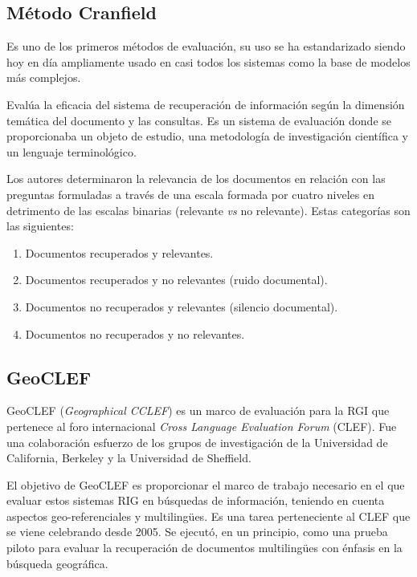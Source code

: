 \subsection{Método Cranfield}\label{sec:Cranfield}

Es uno de los primeros métodos de evaluación, su uso se ha estandarizado 
siendo hoy en día ampliamente usado en casi todos los sistemas como la base de
modelos más complejos.\cite{hosseini2013}

Evalúa la eficacia del sistema de recuperación de información según la
dimensión temática del documento y las consultas. Es un sistema de evaluación
donde se proporcionaba un objeto de estudio, una metodología de investigación
científica y un lenguaje terminológico.

Los autores determinaron la relevancia de los documentos en relación
con las preguntas formuladas a través de una escala formada por cuatro niveles
en detrimento de las escalas binarias (relevante \emph{vs} no relevante).
Estas categorías son las siguientes: 

\begin{enumerate}
    \item Documentos recuperados y relevantes.
    \item Documentos recuperados y no relevantes (ruido documental).
    \item Documentos no recuperados y relevantes (silencio documental).
    \item Documentos no recuperados y no relevantes. 
\end{enumerate}

\subsection{GeoCLEF}\label{sec:GeoCLEF}

GeoCLEF (\emph{Geographical CCLEF}) es un marco de evaluación para la RGI que
pertenece al foro internacional \emph{Cross Language Evaluation Forum} (CLEF).
Fue una colaboración esfuerzo de los grupos de investigación de la Universidad
de California, Berkeley y la Universidad de Sheffield.
\cite{gey2005, kornai2005}

El objetivo de GeoCLEF es proporcionar el marco de trabajo necesario en el que
evaluar estos sistemas RIG en búsquedas de información, teniendo en cuenta
aspectos geo-referenciales y multiling\"ues. Es una tarea perteneciente al CLEF
que se viene celebrando desde 2005. Se ejecutó, en un principio, como una
prueba piloto para evaluar la recuperación de documentos multiling\"ues con
énfasis en la búsqueda geográfica.

\newpage
